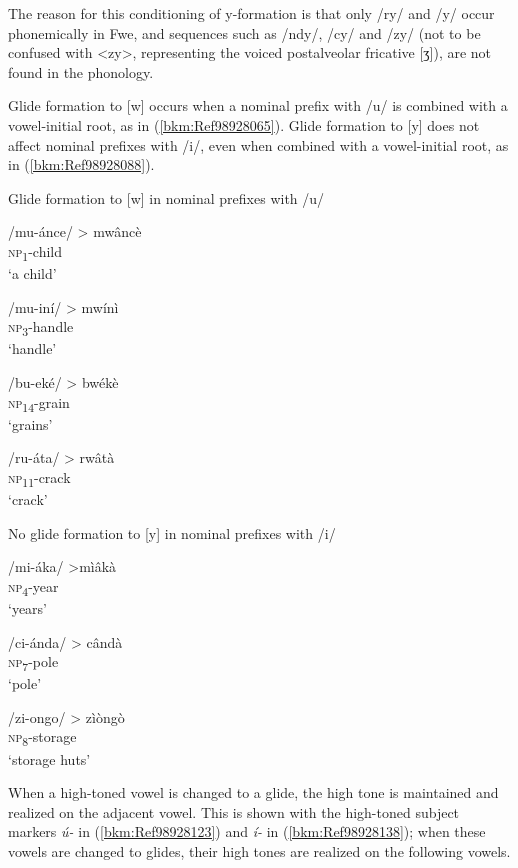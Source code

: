 The reason for this conditioning of y-formation is that only /ry/ and /y/ occur phonemically in Fwe, and sequences such as /ndy/, /cy/ and /zy/ (not to be confused with <zy>, representing the voiced postalveolar fricative [ʒ]), are not found in the phonology.

Glide formation to [w] occurs when a nominal prefix with /u/ is combined with a vowel-initial root, as in (\ref{bkm:Ref98928065}). Glide formation to [y] does not affect nominal prefixes with /i/, even when combined with a vowel-initial root, as in (\ref{bkm:Ref98928088}).

\ea
\label{bkm:Ref98928065}
  Glide formation to [w] in nominal prefixes with /u/

\ea
/mu-ánce/ > mwâncè\\
\textsc{np}\textsubscript{1}-child\\
\glt ‘a child’

\ex
/mu-iní/ > mwínì\\
\textsc{np}\textsubscript{3}-handle\\
\glt ‘handle’

\ex
/bu-eké/ > bwékè\\
\textsc{np}\textsubscript{14}-grain\\
\glt ‘grains’

\ex
/ru-áta/ > rwâtà\\
\textsc{np}\textsubscript{11}-crack\\
\glt ‘crack’
\z\z

\ea
\label{bkm:Ref98928088}
  No glide formation to [y] in nominal prefixes with /i/

\ea
/mi-áka/ >mìâkà \\
\textsc{np}\textsubscript{4}-year\\
\glt ‘years’

\ex
/ci-ánda/ > cândà\\
\textsc{np}\textsubscript{7}-pole\\
\glt ‘pole’

\ex
/zi-ongo/ > zìòngò\\
\textsc{np}\textsubscript{8}-storage\\
\glt ‘storage huts’
\z\z

When a high-toned vowel is changed to a glide, the high tone is maintained and realized on the adjacent vowel. This is shown with the high-toned subject markers \textit{ú-} in (\ref{bkm:Ref98928123}) and \textit{í-} in (\ref{bkm:Ref98928138}); when these vowels are changed to glides, their high tones are realized on the following vowels.

